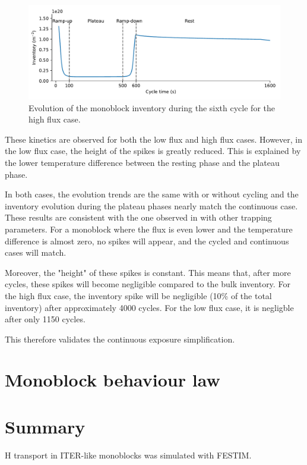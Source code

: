 \begin{figure}
    \centering
    \includegraphics[width=\linewidth]{Figures/Chapter3/monoblocks/inventory_one_cycle.pdf}
    \caption{Evolution of the monoblock inventory during the sixth cycle for the high flux case.}
\end{figure}

These kinetics are observed for both the low flux and high flux cases.
However, in the low flux case, the height of the spikes is greatly reduced.
This is explained by the lower temperature difference between the resting phase and the plateau phase.

In both cases, the evolution trends are the same with or without cycling and the inventory evolution during the plateau phases nearly match the continuous case.
These results are consistent with the one observed in  with other trapping parameters.
For a monoblock where the flux is even lower and the temperature difference is almost zero, no spikes will appear, and the cycled and continuous cases will match.

Moreover, the "height" of these spikes is constant.
This means that, after more cycles, these spikes will become negligible compared to the bulk inventory.
For the high flux case, the inventory spike will be negligible (10\% of the total inventory) after approximately 4000 cycles.
For the low flux case, it is negligble after only 1150 cycles.

This therefore validates the continuous exposure simplification.


\section{Monoblock behaviour law}



\section{Summary}
H transport in ITER-like monoblocks was simulated with FESTIM.

